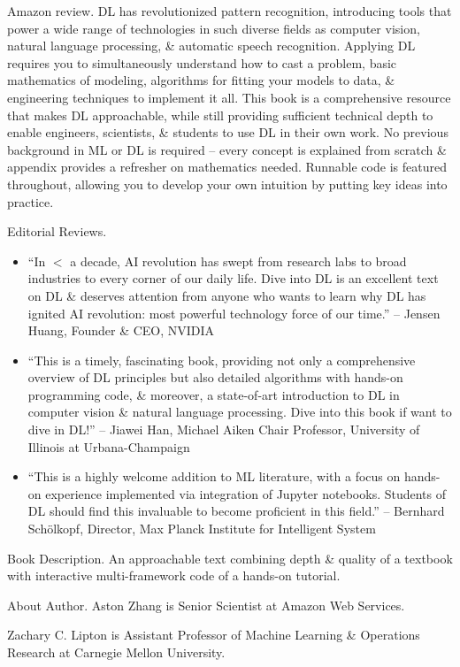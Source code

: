 \documentclass{article}
\begin{document}
{\sf Amazon review.} DL has revolutionized pattern recognition, introducing tools that power a wide range of technologies in such diverse fields as computer vision, natural language processing, \& automatic speech recognition. Applying DL requires you to simultaneously understand how to cast a problem, basic mathematics of modeling, algorithms for fitting your models to data, \& engineering techniques to implement it all. This book is a comprehensive resource that makes DL approachable, while still providing sufficient technical depth to enable engineers, scientists, \& students to use DL in their own work. No previous background in ML or DL is required -- every concept is explained from scratch \& appendix provides a refresher on mathematics needed. Runnable code is featured throughout, allowing you to develop your own intuition by putting key ideas into practice.

{\sf Editorial Reviews.}
\begin{itemize}
	\item ``In $<$ a decade, AI revolution has swept from research labs to broad industries to every corner of our daily life. Dive into DL is an excellent text on DL \& deserves attention from anyone who wants to learn why DL has ignited AI revolution: most powerful technology force of our time.'' -- {\sc Jensen Huang}, Founder \& CEO, NVIDIA
	\item ``This is a timely, fascinating book, providing not only a comprehensive overview of DL principles but also detailed algorithms with hands-on programming code, \& moreover, a state-of-art introduction to DL in computer vision \& natural language processing. Dive into this book if want to dive in DL!'' -- {\sc Jiawei Han}, Michael Aiken Chair Professor, University of Illinois at Urbana-Champaign
	\item ``This is a highly welcome addition to ML literature, with a focus on hands-on experience implemented via integration of Jupyter notebooks. Students of DL should find this invaluable to become proficient in this field.'' -- {\sc Bernhard Schölkopf}, Director, Max Planck Institute for Intelligent System
\end{itemize}
{\sf Book Description.} An approachable text combining depth \& quality of a textbook with interactive multi-framework code of a hands-on tutorial.

{\sf About Author.} {\sc Aston Zhang} is Senior Scientist at Amazon Web Services.

{\sc Zachary C. Lipton} is Assistant Professor of Machine Learning \& Operations Research at Carnegie Mellon University.
\end{document}
